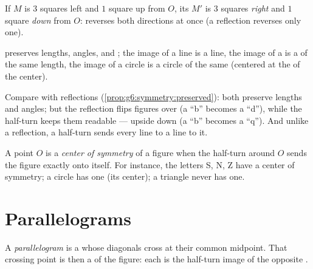 \begin{example}[On a grid]\label{ex:g7:central:grid}
If $M$ is $3$ squares left and $1$ square up from $O$, its 
$M'$ is $3$ squares \emph{right} and $1$ square \emph{down} from $O$:
 reverses both directions at once (a reflection
reverses only one).
\end{example}

\begin{proposition}\label{prop:g7:central:preserved}
 preserves lengths, angles,  and ; the
image of a line is a \emph{} line, the image of a  is a
  of the same length, the image of a circle is a circle
of the same  (centered at the  of the center).
\end{proposition}
\admitted

\begin{remark}
Compare with reflections (\cref{prop:g6:symmetry:preserved}): both
preserve lengths and angles; but the reflection flips figures over
(a ``b'' becomes a ``d''), while the half-turn keeps them readable ---
upside down (a ``b'' becomes a ``q''). And unlike a reflection, a
half-turn sends every line to a line  to it.
\end{remark}

\begin{definition}\label{def:g7:central:center}
A point $O$ is a \emph{center of symmetry}
of a figure when the half-turn around $O$ sends the figure exactly
onto itself. For instance, the letters S, N, Z have a center of
symmetry; a circle has one (its center); a triangle never has one.
\end{definition}

\section{Parallelograms}

\begin{definition}[Parallelogram]\label{def:g7:central:parallelogram}
A \emph{parallelogram} is a  whose
diagonals cross at their common midpoint. That crossing point is then
a  of the figure: each  is the half-turn image
of the opposite .
\end{definition}

